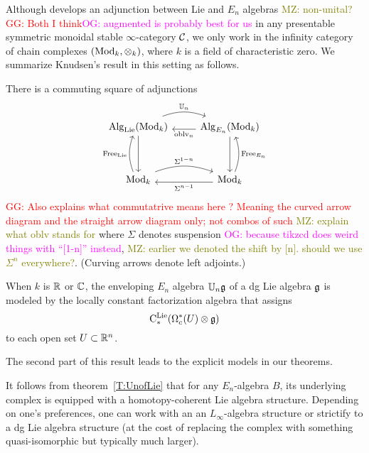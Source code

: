 \documentclass[11pt]{amsart}
\numberwithin{equation}{section}
\def\owen{\textcolor{magenta}{OG: }\textcolor{magenta}}
\def\mahmoud{\textcolor{olive}{MZ: }\textcolor{olive}}
\def\greg{\textcolor{red}{GG: }\textcolor{red}}
\begin{document}
Although \cite{Knudsen} develops an adjunction between Lie and $E_n$ algebras \mahmoud{non-unital?}\greg{Both I think}\owen{augmented is probably best for us}
in any presentable symmetric monoidal stable $\infty$-category $\mathcal C$,
we only work in the infinity category of chain complexes $({\rm Mod}_k, \otimes_k)$, where $k$ is a field of characteristic zero.
We summarize Knudsen's result in this setting as follows.




\begin{thm}\label{T:UnofLie}
There is a commuting square of adjunctions
\[
\begin{tikzcd}
\Alg_\Lie(\Mod_k) \arrow[r, bend left=20, shift left=.5ex,"\UU_n"] \arrow[dd] & \Alg_{E_n}(\Mod_k) \arrow[l, shift left=.5ex, "\oblv_n"] \arrow[dd]\\
&\\
\Mod_k \arrow[r, bend left=20, shift left=.5ex, "\Sigma^{1-n}"] \arrow[uu, bend left=20, shift left=.5ex, "\Free_\Lie"] & \Mod_k \arrow[l, shift left=.5ex,"\Sigma^{n-1}"] \arrow[uu, bend right=20, shift right=.5ex, "\Free_{E_n}"']
\end{tikzcd}
\]
\greg{Also explains what commutatrive means here ? Meaning the curved arrow diagram and the straight arrow diagram only; not combos of such}
\mahmoud{explain what oblv stands for}
where $\Sigma$ denotes suspension \owen{because tikzcd does weird things with ``[1-n]'' instead}, \mahmoud{earlier we denoted the shift by [n]. should we use $\Sigma^n$ everywhere?}.
(Curving arrows denote left adjoints.)

When $k$ is $\mathbb R$ or $\mathbb C$, 
the enveloping $E_n$ algebra $\mathbb U_n \mathfrak g$ of a dg Lie algebra $\mathfrak g$ is modeled by the locally constant factorization algebra that assigns
\[
{\rm C}^{\rm Lie}_*(\Omega^*_c(U) \otimes \mathfrak g)
\]
to each open set $U \subset \mathbb R^n$.
\end{thm}

The second part of this result leads to the explicit models in our theorems.

\begin{rmk}
It follows from theorem~\ref{T:UnofLie} that for any $E_n$-algebra $B$, 
its underlying complex is equipped with a homotopy-coherent Lie algebra structure.
Depending on one's preferences, one can work with an an $L_\infty$-algebra structure or strictify to a dg Lie algebra structure (at the cost of replacing the complex with something quasi-isomorphic but typically much larger).
\end{rmk}
\end{document}
